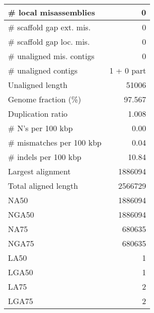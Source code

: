 \documentclass[12pt,a4paper]{article}
\begin{document}
\begin{table}[ht]
\begin{center}
\begin{tabular}{|l*{1}{|r}|}
\# local misassemblies & 0 \\ \hline
\# scaffold gap ext. mis. & 0 \\ \hline
\# scaffold gap loc. mis. & 0 \\ \hline
\# unaligned mis. contigs & 0 \\ \hline
\# unaligned contigs & 1 + 0 part \\ \hline
Unaligned length & 51006 \\ \hline
Genome fraction (\%) & 97.567 \\ \hline
Duplication ratio & 1.008 \\ \hline
\# N's per 100 kbp & 0.00 \\ \hline
\# mismatches per 100 kbp & 0.04 \\ \hline
\# indels per 100 kbp & 10.84 \\ \hline
Largest alignment & 1886094 \\ \hline
Total aligned length & 2566729 \\ \hline
NA50 & 1886094 \\ \hline
NGA50 & 1886094 \\ \hline
NA75 & 680635 \\ \hline
NGA75 & 680635 \\ \hline
LA50 & 1 \\ \hline
LGA50 & 1 \\ \hline
LA75 & 2 \\ \hline
LGA75 & 2 \\ \hline
\end{tabular}
\end{center}
\end{table}
\end{document}
